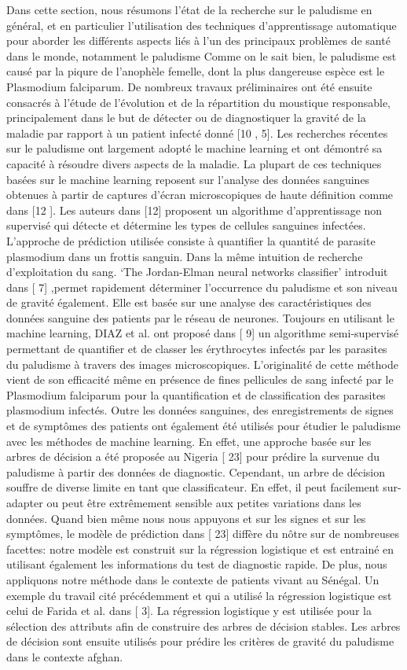 Dans cette section, nous résumons l’état de la recherche sur le paludisme en général, et en particulier l’utilisation des techniques d’apprentissage automatique pour aborder les différents aspects liés à l’un des principaux problèmes de santé dans le monde, notamment le paludisme
Comme on le sait bien, le paludisme est causé par la piqure de l’anophèle femelle, dont la plus dangereuse espèce est le Plasmodium falciparum. De nombreux travaux préliminaires ont été ensuite consacrés à l’étude de l’évolution et de la répartition du moustique responsable, principalement dans le but de détecter ou de diagnostiquer la gravité de la maladie par rapport à un patient infecté donné [10 , 5]. Les recherches récentes sur le paludisme ont largement adopté le machine learning et ont démontré sa capacité à résoudre divers aspects de la maladie. La plupart de ces techniques basées sur le machine learning reposent sur l'analyse des données sanguines obtenues à partir de captures d'écran microscopiques de haute définition comme dans [12 ]. Les auteurs dans [12] proposent un algorithme d'apprentissage non supervisé qui détecte et détermine les types de cellules sanguines infectées. L’approche de prédiction utilisée consiste à quantifier la quantité de parasite plasmodium dans un frottis sanguin. Dans la même intuition de recherche d’exploitation du sang. ‘The Jordan-Elman neural networks classifier’ introduit dans [ 7] ,permet rapidement déterminer l'occurrence du paludisme et son niveau de gravité également. Elle est basée sur une analyse des caractéristiques des données sanguine des patients par le réseau de neurones. Toujours en utilisant le machine learning, DIAZ et al. ont proposé dans [ 9] un algorithme semi-supervisé permettant de quantifier et de classer les érythrocytes infectés par les parasites du paludisme à travers des images microscopiques. L'originalité de cette méthode vient de son efficacité même en présence de fines pellicules de sang infecté par le Plasmodium falciparum pour la quantification et de classification des parasites plasmodium infectés. Outre les données sanguines, des enregistrements de signes et de symptômes des patients ont également été utilisés pour étudier le paludisme avec les méthodes  de machine learning. En effet, une approche basée sur les arbres de décision a été proposée au Nigeria [ 23] pour prédire la survenue du paludisme à partir des données de diagnostic. Cependant, un arbre de décision souffre de diverse limite en tant que classificateur. En effet, il peut facilement sur-adapter ou peut être extrêmement sensible aux petites variations dans les données. Quand bien même nous nous appuyons et sur les signes et sur les symptômes, le modèle de prédiction dans [ 23] diffère du nôtre sur de nombreuses facettes: notre modèle est construit sur la régression logistique et est entrainé  en utilisant également les informations du test de diagnostic rapide. De plus, nous appliquons notre méthode dans le contexte de patients vivant au Sénégal. Un exemple du travail cité précédemment et qui a utilisé la régression logistique est celui de Farida et al. dans [ 3]. La régression logistique y est utilisée pour la sélection des attributs afin de construire des arbres de décision stables. Les arbres de décision sont ensuite utilisés pour prédire les critères de gravité du paludisme dans le contexte afghan.
